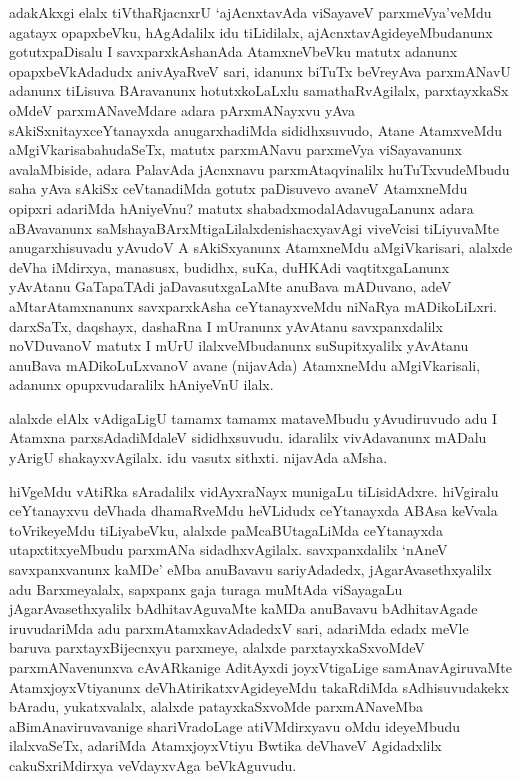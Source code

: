 \begin{artha}%
adakAkxgi elalx tiVthaRjacnxrU `ajAcnxtavAda viSayaveV parxmeVya'\break veMdu agatayx opapxbeVku, hAgAdalilx idu tiLidilalx, ajAcnxtavAgideyeMbudanunx gotutxpaDisalu I savxparxkAshanAda AtamxneVbeVku matutx adanunx opapxbeVkAdadudx anivAyaRveV sari, idanunx biTuTx beVreyAva parxmANavU adanunx tiLisuva BAravanunx hotutxkoLaLxlu samathaRvAgilalx, parxtayxkaSx oMdeV parxmANaveMdare adara pArxmANayxvu yAva sAkiSxnitayxceYtanayxda anugarxhadiMda sididhxsuvudo, Atane AtamxveMdu aMgiVkarisabahudaSeTx, matutx parxmANavu parxmeVya viSayavanunx avalaMbiside, adara PalavAda jAcnxnavu parxmAtaqvinalilx huTuTxvudeMbudu saha yAva sAkiSx ceVtanadiMda gotutx paDisuvevo avaneV AtamxneMdu opipxri adariMda hAniyeVnu? matutx shabadxmodalAdavugaLanunx adara aBAvavanunx saMshayaBArxMtigaLilalxde\break nishacxyavAgi viveVcisi tiLiyuvaMte anugarxhisuvadu yAvudoV A sAkiSxyanunx AtamxneMdu aMgiVkarisari, alalxde deVha iMdirxya, manasusx, budidhx, suKa, duHKAdi vaqtitxgaLanunx yAvAtanu GaTapaTAdi jaDavasutxgaLaMte anuBava mADuvano, adeV aMtarAtamxnanunx savxparxkAsha ceYtanayxveMdu niNaRya mADikoLiLxri. darxSaTx, daqshayx, dashaRna I mUranunx yAvAtanu savxpanxdalilx noVDuvanoV matutx I mUrU ilalxveMbudanunx suSupitxyalilx yAvAtanu anuBava mADikoLuLxvanoV avane (nijavAda) AtamxneMdu aMgiVkarisali, adanunx opupxvudaralilx hAniyeVnU ilalx.
\end{artha}

\begin{artha}
alalxde elAlx vAdigaLigU tamamx tamamx mataveMbudu yAvudiruvudo adu I Atamxna parxsAdadiMdaleV sididhxsuvudu. idaralilx vivAdavanunx mADalu yArigU shakayxvAgilalx. idu vasutx sithxti. nijavAda aMsha. 
\end{artha}

\begin{artha}
hiVgeMdu vAtiRka sAradalilx vidAyxraNayx munigaLu tiLisidAdxre. hiVgiralu ceYtanayxvu deVhada dhamaRveMdu heVLidudx ceYtanayxda ABAsa keVvala toVrikeyeMdu tiLiyabeVku, alalxde paMcaBUtagaLiMda ceYtanayxda utapxtitxyeMbudu parxmANa sidadhxvAgilalx. savxpanxdalilx `nAneV savxpanxvanunx kaMDe' eMba anuBavavu sariyAdadedx, jAgarAvasethxyalilx adu Barxmeyalalx, sapxpanx gaja turaga muMtAda viSayagaLu jAgarAvasethxyalilx bAdhitavAguvaMte kaMDa anuBavavu bAdhitavAgade iruvudariMda adu parxmAtamxkavAdadedxV sari, adariMda edadx meVle baruva parxtayxBijecnxyu parxmeye, alalxde parxtayxkaSxvoMdeV parxmANavenunxva cAvARkanige AditAyxdi joyxVtigaLige samAnavAgiruvaMte AtamxjoyxVtiyanunx deVhAtirikatxvAgideyeMdu takaRdiMda sAdhisuvudakekx bAradu, yukatxvalalx, alalxde patayxkaSxvoMde parxmANaveMba aBimAnaviruvavanige shariVradoLage atiVMdirxyavu oMdu ideyeMbudu ilalxvaSeTx, adariMda AtamxjoyxVtiyu Bwtika deVhaveV Agidadxlilx cakuSxriMdirxya veVdayxvAga beVkAguvudu.
\end{artha}%

